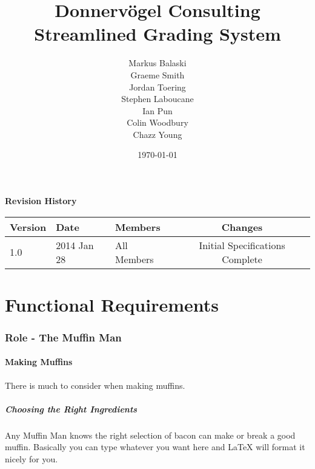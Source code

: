 \documentclass{article}
\begin{document}
\title{Donnervögel Consulting \\ Streamlined Grading System}
\author{Markus Balaski \\ Graeme Smith \\ Jordan Toering \\ Stephen Laboucane \\ Ian Pun \\ Colin Woodbury \\ Chazz Young}
\date{\today}
\maketitle
\clearpage

\textbf{Revision History}\\
\begin{center}
  \begin{tabular}{l l l | c}
    Version & Date & Members & Changes\\
    \hline
    1.0 & 2014 Jan 28 & All Members & Initial Specifications Complete
  \end{tabular}
\end{center}
\clearpage

\tableofcontents
\clearpage

\part{Functional Requirements}
\section{Role - The Muffin Man}
\subsection{Making Muffins}
There is much to consider when making muffins.
\subsubsection{Choosing the Right Ingredients}
Any Muffin Man knows the right selection of bacon can make or break a good
muffin. Basically you can type whatever you want here and LaTeX will format it
nicely for you.
\end{document}
